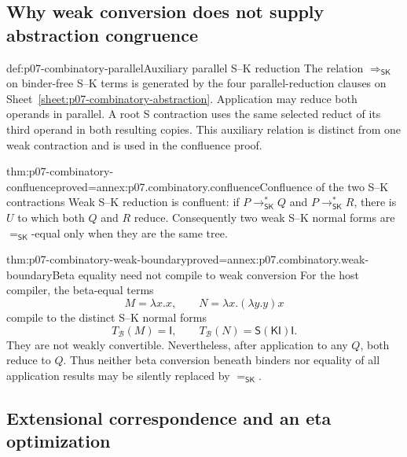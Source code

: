 \subsection{Why weak conversion does not supply abstraction congruence}
\label{sec:p07-combinatory-confluence}

\begin{hbdefinition}{def:p07-combinatory-parallel}{Auxiliary parallel S--K reduction}
The relation \(\Rightarrow_{\mathsf{SK}}\) on binder-free S--K terms is
generated by the four parallel-reduction clauses on
Sheet~\ref{sheet:p07-combinatory-abstraction}. Application may reduce both
operands in parallel. A root S contraction uses the same selected reduct
of its third operand in both resulting copies. This auxiliary relation is
distinct from one weak contraction and is used in the confluence proof.
\end{hbdefinition}

\begin{hbtheorem}{thm:p07-combinatory-confluence}{proved=annex:p07.combinatory.confluence}{Confluence of the two S--K contractions}
Weak S--K reduction is confluent: if
\(P\longrightarrow_{\mathsf{SK}}^*Q\) and
\(P\longrightarrow_{\mathsf{SK}}^*R\), there is \(U\) to which both \(Q\)
and \(R\) reduce.  Consequently two weak S--K normal forms are
\(=_{\mathsf{SK}}\)-equal only when they are the same tree.
\end{hbtheorem}

\begin{hbtheorem}{thm:p07-combinatory-weak-boundary}{proved=annex:p07.combinatory.weak-boundary}{Beta equality need not compile to weak conversion}
For the host compiler, the beta-equal terms
\[
 M=\lambda x.x,\qquad N=\lambda x.(\lambda y.y)x
\]
compile to the distinct S--K normal forms
\[
 T_{\mathcal B}(M)=\mathsf I,\qquad
 T_{\mathcal B}(N)=\mathsf S(\mathsf K\mathsf I)\mathsf I.
\]
They are not weakly convertible.  Nevertheless, after application to any \(Q\),
both reduce to \(Q\).  Thus neither beta conversion beneath binders nor equality
of all application results may be silently replaced by \(=_{\mathsf{SK}}\).
\end{hbtheorem}

\subsection{Extensional correspondence and an eta optimization}
\label{sec:p07-combinatory-extensional}


